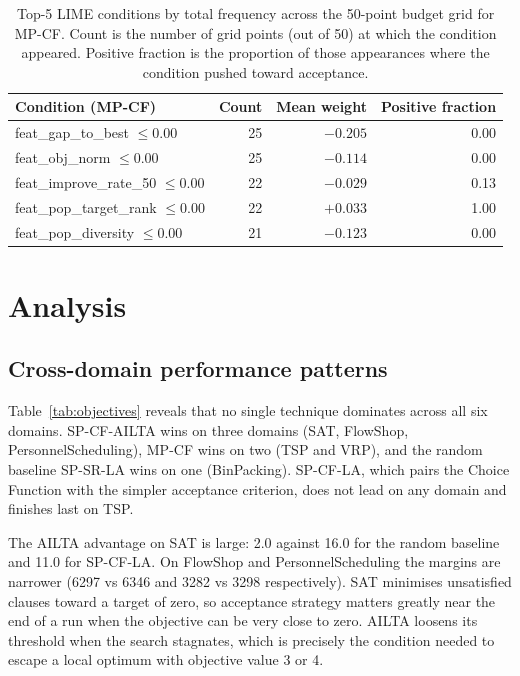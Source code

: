 \documentclass[11pt,a4paper]{article}
\begin{document}
\begin{table}[h]
\centering
\begin{tabular}{lrrr}
\toprule
Condition (MP-CF) & Count & Mean weight & Positive fraction \\
\midrule
feat\_gap\_to\_best $\leq 0.00$    & 25 & $-0.205$ & 0.00 \\
feat\_obj\_norm $\leq 0.00$        & 25 & $-0.114$ & 0.00 \\
feat\_improve\_rate\_50 $\leq 0.00$ & 22 & $-0.029$ & 0.13 \\
feat\_pop\_target\_rank $\leq 0.00$ & 22 & $+0.033$ & 1.00 \\
feat\_pop\_diversity $\leq 0.00$   & 21 & $-0.123$ & 0.00 \\
\bottomrule
\end{tabular}
\caption{Top-5 LIME conditions by total frequency across the 50-point budget
grid for MP-CF. Count is the number of grid points (out of 50) at which the
condition appeared. Positive fraction is the proportion of those appearances
where the condition pushed toward acceptance.}
\label{tab:lime}
\end{table}

\section{Analysis}

\subsection{Cross-domain performance patterns}

Table~\ref{tab:objectives} reveals that no single technique dominates across all six
domains. SP-CF-AILTA wins on three domains (SAT, FlowShop, PersonnelScheduling),
MP-CF wins on two (TSP and VRP), and the random baseline SP-SR-LA wins on one
(BinPacking). SP-CF-LA, which pairs the Choice Function with the simpler acceptance
criterion, does not lead on any domain and finishes last on TSP.

The AILTA advantage on SAT is large: 2.0 against 16.0 for the random baseline and
11.0 for SP-CF-LA. On FlowShop and PersonnelScheduling the margins are narrower
(6297 vs 6346 and 3282 vs 3298 respectively). SAT minimises unsatisfied clauses
toward a target of zero, so acceptance strategy matters greatly near the end of a
run when the objective can be very close to zero. AILTA loosens its threshold when
the search stagnates, which is precisely the condition needed to escape a local
optimum with objective value 3 or 4.
\end{document}
